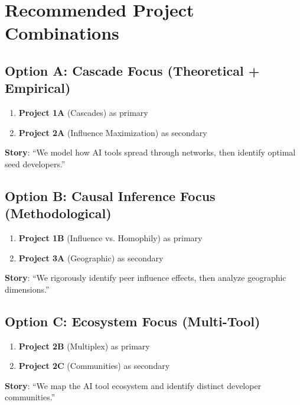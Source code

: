 \documentclass[11pt,letterpaper]{article}
\begin{document}
\section{Recommended Project Combinations}

\subsection{Option A: Cascade Focus (Theoretical + Empirical)}

\begin{enumerate}
    \item \textbf{Project 1A} (Cascades) as primary
    \item \textbf{Project 2A} (Influence Maximization) as secondary
\end{enumerate}

\textbf{Story}: ``We model how AI tools spread through networks, then identify optimal seed developers.''

\subsection{Option B: Causal Inference Focus (Methodological)}

\begin{enumerate}
    \item \textbf{Project 1B} (Influence vs. Homophily) as primary
    \item \textbf{Project 3A} (Geographic) as secondary
\end{enumerate}

\textbf{Story}: ``We rigorously identify peer influence effects, then analyze geographic dimensions.''

\subsection{Option C: Ecosystem Focus (Multi-Tool)}

\begin{enumerate}
    \item \textbf{Project 2B} (Multiplex) as primary
    \item \textbf{Project 2C} (Communities) as secondary
\end{enumerate}

\textbf{Story}: ``We map the AI tool ecosystem and identify distinct developer communities.''
\end{document}
